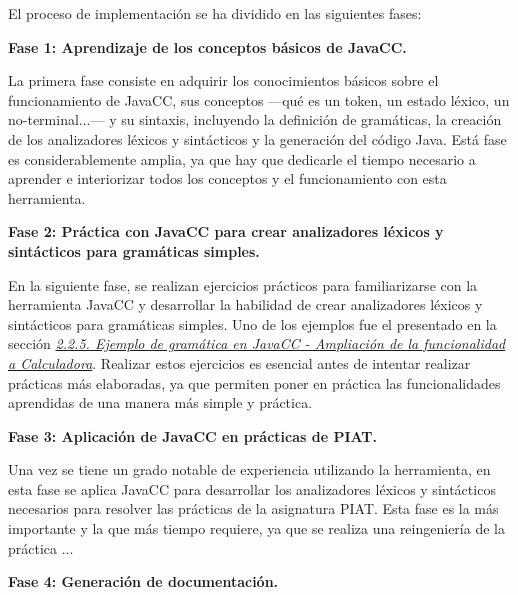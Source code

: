 \noindent El proceso de implementación se ha dividido en las siguientes fases:

\phantom{text}

\noindent \textbf{Fase 1: Aprendizaje de los conceptos básicos de JavaCC.}

\phantom{text}

\noindent La primera fase consiste en adquirir los conocimientos básicos sobre el funcionamiento de JavaCC, sus conceptos ---qué es un token, un estado léxico, un no-terminal...--- y su sintaxis, incluyendo la definición de gramáticas, la creación de los analizadores léxicos y sintácticos y la generación del código Java. Está fase es considerablemente amplia, ya que hay que dedicarle el tiempo necesario a aprender e interiorizar todos los conceptos y el funcionamiento con esta herramienta.

\phantom{text}

\noindent \textbf{Fase 2: Práctica con JavaCC para crear analizadores léxicos y sintácticos para gramáticas simples.}

\phantom{text}
    
\noindent En la siguiente fase, se realizan ejercicios prácticos para familiarizarse con la herramienta JavaCC y desarrollar la habilidad de crear analizadores léxicos y sintácticos para gramáticas simples. Uno de los ejemplos fue el presentado en la sección \hyperref[sec:ampliacioncalculadora]{\textit{2.2.5. Ejemplo de gramática en JavaCC - Ampliación de la funcionalidad a Calculadora}}. Realizar estos ejercicios es esencial antes de intentar realizar prácticas más elaboradas, ya que permiten poner en práctica las funcionalidades aprendidas de una manera más simple y práctica.

\phantom{text}

\noindent \textbf{Fase 3: Aplicación de JavaCC en prácticas de PIAT.}

\phantom{text}

\noindent Una vez se tiene un grado notable de experiencia utilizando la herramienta, en esta fase se aplica JavaCC para desarrollar los analizadores léxicos y sintácticos necesarios para resolver las prácticas de la asignatura PIAT. Esta fase es la más importante y la que más tiempo requiere, ya que se realiza una reingeniería de la práctica ... 


\phantom{text}

\noindent \textbf{Fase 4: Generación de documentación.}

\phantom{text}

